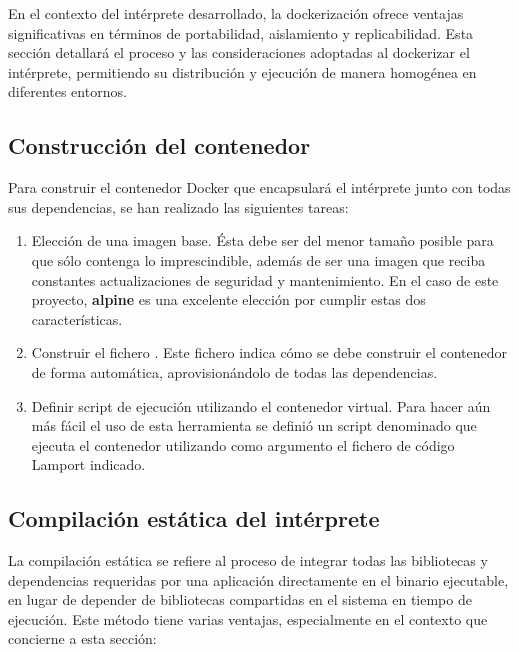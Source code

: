 En el contexto del intérprete desarrollado, la dockerización ofrece ventajas significativas en términos de portabilidad, aislamiento y replicabilidad. Esta sección detallará el proceso y las consideraciones adoptadas al dockerizar el intérprete, permitiendo su distribución y ejecución de manera homogénea en diferentes entornos.

\subsection{Construcción del contenedor}
Para construir el contenedor Docker que encapsulará el intérprete junto con todas sus dependencias, se han realizado las siguientes tareas:

\begin{enumerate}
    \item Elección de una imagen base. Ésta debe ser del menor tamaño posible para que sólo contenga lo imprescindible, además de ser una imagen que reciba constantes actualizaciones de seguridad y mantenimiento. En el caso de este proyecto, \textbf{alpine} es una excelente elección por cumplir estas dos características.
    \item Construir el fichero . Este fichero indica cómo se debe construir el contenedor de forma automática, aprovisionándolo de todas las dependencias.
    \item Definir script de ejecución utilizando el contenedor virtual. Para hacer aún más fácil el uso de esta herramienta se definió un script denominado  que ejecuta el contenedor utilizando como argumento el fichero de código Lamport indicado.
\end{enumerate}

\subsection{Compilación estática del intérprete}
La compilación estática se refiere al proceso de integrar todas las bibliotecas y dependencias requeridas por una aplicación directamente en el binario ejecutable, en lugar de depender de bibliotecas compartidas en el sistema en tiempo de ejecución. Este método tiene varias ventajas, especialmente en el contexto que concierne a esta sección:

